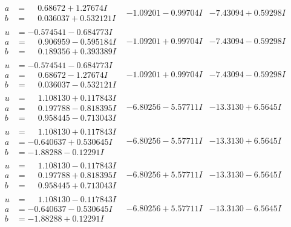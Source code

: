\documentclass[1p]{elsarticle_modified}
\theoremstyle{definition}
\begin{document}
$$\begin{array}{c|c|c}
\begin{aligned}
a &= \phantom{-}0.68672 + 1.27674 I \\
b &= \phantom{-}0.036037 + 0.532121 I\end{aligned}
 & -1.09201 - 0.99704 I & -7.43094 + 0.59298 I \\ \hline\begin{aligned}
u &= -0.574541 - 0.684773 I \\
a &= \phantom{-}0.906959 - 0.595184 I \\
b &= \phantom{-}0.189356 + 0.393389 I\end{aligned}
 & -1.09201 + 0.99704 I & -7.43094 - 0.59298 I \\ \hline\begin{aligned}
u &= -0.574541 - 0.684773 I \\
a &= \phantom{-}0.68672 - 1.27674 I \\
b &= \phantom{-}0.036037 - 0.532121 I\end{aligned}
 & -1.09201 + 0.99704 I & -7.43094 - 0.59298 I \\ \hline\begin{aligned}
u &= \phantom{-}1.108130 + 0.117843 I \\
a &= \phantom{-}0.197788 - 0.818395 I \\
b &= \phantom{-}0.958445 - 0.713043 I\end{aligned}
 & -6.80256 - 5.57711 I & -13.3130 + 6.5645 I \\ \hline\begin{aligned}
u &= \phantom{-}1.108130 + 0.117843 I \\
a &= -0.640637 + 0.530645 I \\
b &= -1.88288 - 0.12291 I\end{aligned}
 & -6.80256 - 5.57711 I & -13.3130 + 6.5645 I \\ \hline\begin{aligned}
u &= \phantom{-}1.108130 - 0.117843 I \\
a &= \phantom{-}0.197788 + 0.818395 I \\
b &= \phantom{-}0.958445 + 0.713043 I\end{aligned}
 & -6.80256 + 5.57711 I & -13.3130 - 6.5645 I \\ \hline\begin{aligned}
u &= \phantom{-}1.108130 - 0.117843 I \\
a &= -0.640637 - 0.530645 I \\
b &= -1.88288 + 0.12291 I\end{aligned}
 & -6.80256 + 5.57711 I & -13.3130 - 6.5645 I \\ \hline\begin{aligned}

\end{aligned}
\end{array}$$
\end{document}
